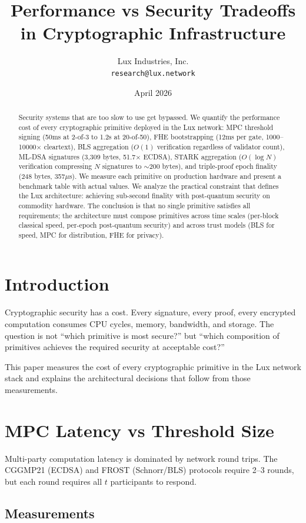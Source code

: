 \documentclass[11pt,a4paper]{article}
\title{Performance vs Security Tradeoffs\\in Cryptographic Infrastructure}
\author{
Lux Industries, Inc.\\
\texttt{research@lux.network}
}
\date{April 2026}
\begin{document}
\luxcoverpage

\begin{abstract}
Security systems that are too slow to use get bypassed. We quantify the performance cost of every cryptographic primitive deployed in the Lux network: MPC threshold signing (50ms at 2-of-3 to 1.2s at 20-of-50), FHE bootstrapping (12ms per gate, 1000--10000$\times$ cleartext), BLS aggregation ($O(1)$ verification regardless of validator count), ML-DSA signatures (3,309 bytes, 51.7$\times$ ECDSA), STARK aggregation ($O(\log N)$ verification compressing $N$ signatures to $\sim$200 bytes), and triple-proof epoch finality (248 bytes, 357$\mu$s). We measure each primitive on production hardware and present a benchmark table with actual values. We analyze the practical constraint that defines the Lux architecture: achieving sub-second finality with post-quantum security on commodity hardware. The conclusion is that no single primitive satisfies all requirements; the architecture must compose primitives across time scales (per-block classical speed, per-epoch post-quantum security) and across trust models (BLS for speed, MPC for distribution, FHE for privacy).
\end{abstract}

\section{Introduction}

Cryptographic security has a cost. Every signature, every proof, every encrypted computation consumes CPU cycles, memory, bandwidth, and storage. The question is not ``which primitive is most secure?'' but ``which composition of primitives achieves the required security at acceptable cost?''

This paper measures the cost of every cryptographic primitive in the Lux network stack and explains the architectural decisions that follow from those measurements.

\section{MPC Latency vs Threshold Size}

Multi-party computation latency is dominated by network round trips. The CGGMP21 (ECDSA) and FROST (Schnorr/BLS) protocols require 2--3 rounds, but each round requires all $t$ participants to respond.

\subsection{Measurements}
\end{document}

